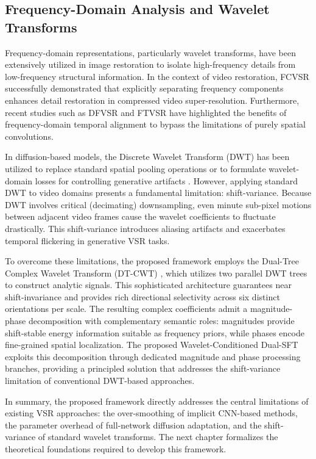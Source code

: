 \subsection{Frequency-Domain Analysis and Wavelet Transforms}
Frequency-domain representations, particularly wavelet transforms, have been extensively utilized in image restoration to isolate high-frequency details from low-frequency structural 
information. In the context of video restoration, FCVSR \cite{zhu2025fcvsr} successfully demonstrated that explicitly separating frequency components enhances detail restoration in compressed video super-resolution. Furthermore, recent studies such as DFVSR \cite{dong2023dfvsr} and FTVSR \cite{zhong2022ftvsr} 
have highlighted the benefits of frequency-domain temporal alignment to bypass the limitations of purely spatial convolutions.

In diffusion-based models, the Discrete Wavelet Transform (DWT) has been utilized to replace standard spatial pooling operations \cite{liu2018mwcnn} or to formulate wavelet-domain losses for controlling generative artifacts \cite{korkmaz2024training}. However, applying standard DWT to video domains presents a fundamental limitation: shift-variance. Because DWT involves critical (decimating) downsampling, even minute sub-pixel 
motions between adjacent video frames cause the wavelet coefficients to fluctuate drastically. This shift-variance introduces aliasing artifacts and exacerbates temporal flickering in generative VSR tasks.

To overcome these limitations, the proposed framework employs the Dual-Tree Complex Wavelet Transform (DT-CWT) \cite{selesnick2005dtcwt}, which utilizes two parallel DWT trees to construct analytic signals. This sophisticated architecture guarantees near shift-invariance and provides rich directional selectivity across six distinct orientations per scale. The resulting complex coefficients admit a magnitude-phase decomposition with complementary semantic roles: magnitudes provide shift-stable energy information suitable as frequency priors, while phases encode fine-grained spatial localization. The proposed Wavelet-Conditioned Dual-SFT exploits this decomposition through dedicated magnitude and phase processing branches, providing a principled solution that addresses the shift-variance limitation of conventional DWT-based approaches.

In summary, the proposed framework directly addresses the central limitations of existing VSR approaches: the over-smoothing of implicit CNN-based methods, the parameter overhead of full-network diffusion adaptation, and the shift-variance of standard wavelet transforms. The next chapter formalizes the theoretical foundations required to develop this framework.


